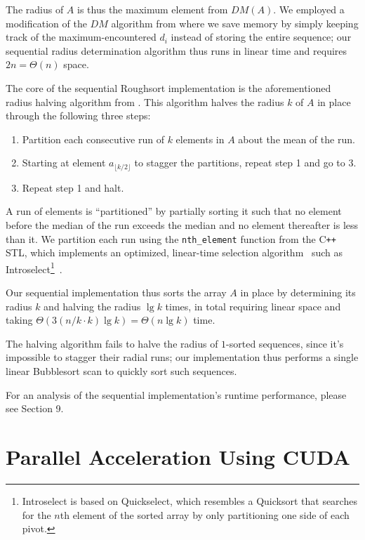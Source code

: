 \documentclass[letterpaper, 12pt]{article}
\let\supercite\cite
\renewcommand{\cite}[1]{\textnormal{~\supercite{#1}}}
\begin{document}
The radius of $A$ is thus the maximum element from $DM(A)$. We employed a modification of the $DM$ algorithm from
  \supercite{altman89} where we save memory by simply keeping track of the maximum-encountered $d_i$ instead of storing the
  entire sequence; our sequential radius determination algorithm thus runs in linear time and requires $2n = \Theta(n)$ space.

The core of the sequential Roughsort implementation is the aforementioned radius halving algorithm from \supercite{altman89}.
This algorithm halves the radius $k$ of $A$ in place through the following three steps:
\begin{enumerate}\setlength{\itemsep}{0pt}\setlength{\parskip}{0pt}
\item Partition each consecutive run of $k$ elements in $A$ about the mean of the run.
\item Starting at element $a_{\lfloor k/2 \rfloor}$ to stagger the partitions, repeat step 1 and go to 3.
\item Repeat step 1 and halt.
\end{enumerate}
A run of elements is ``partitioned'' by partially sorting it such that no element before the median of the run exceeds
  the median and no element thereafter is less than it.
We partition each run using the \texttt{nth_element} function from the  C\texttt{++} STL, which implements an optimized,
  linear-time selection algorithm\cite{clrs} such as
  Introselect\footnote{Introselect is based on Quickselect, which resembles a Quicksort
  that searches for the $n$th element of the sorted array by only partitioning one side of each pivot.}\cite{selectalg}.

Our sequential implementation thus sorts the array $A$ in place by determining its radius $k$ and halving the radius
  $\lg k$ times, in total requiring linear space and taking $\Theta(3(n/k \cdot k) \lg k) = \Theta(n \lg k)$ time.

The halving algorithm fails to halve the radius of $1$-sorted sequences, since it's impossible to stagger their radial runs;
  our implementation thus performs a single linear Bubblesort scan to quickly sort such sequences.

For an analysis of the sequential implementation's runtime performance, please see Section 9.

\section{Parallel Acceleration Using CUDA}
\end{document}
